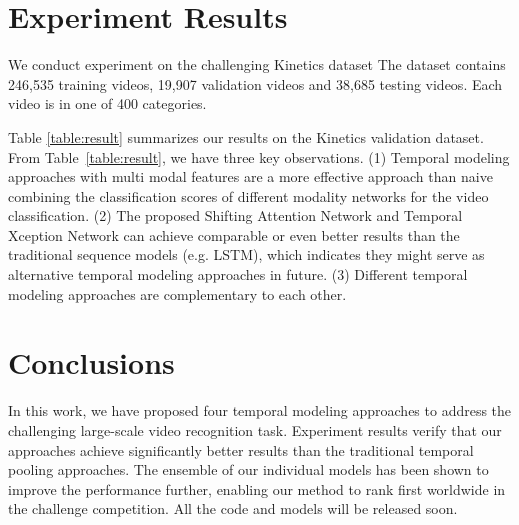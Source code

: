 \documentclass[10pt,twocolumn,letterpaper]{article}
\begin{document}
\section{Experiment Results}
\label{sec:4}
We conduct experiment on the challenging Kinetics dataset
The dataset contains 246,535 training videos, 19,907 validation videos and 38,685 testing videos. Each video is in one of 400 categories.

Table \ref{table:result} summarizes our results on the Kinetics validation dataset. From Table~\ref{table:result}, we have three key observations. (1) Temporal modeling approaches with multi modal features are a more effective approach than naive combining the classification scores of different modality networks for the video classification. (2) The proposed Shifting Attention Network and Temporal Xception Network can achieve comparable or even better results than the traditional sequence models (e.g. LSTM), which indicates they might serve as alternative temporal modeling approaches in future. (3) Different temporal modeling approaches are complementary to each other.



\section{Conclusions}
\label{sec:5}
In this work, we have proposed four temporal modeling approaches to address the challenging large-scale video recognition task.
Experiment results verify that our approaches achieve significantly better results than the traditional temporal pooling approaches.
The ensemble of our individual models has been shown to improve the performance further, enabling our method to rank first worldwide in the challenge competition. All the code and models will be released soon.
\end{document}
